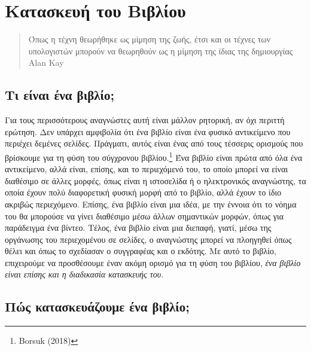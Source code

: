 \documentclass[
]{article}
\author{}
\date{}
\begin{document}
\hypertarget{ux3baux3b1ux3c4ux3b1ux3c3ux3baux3b5ux3c5ux3ae-ux3c4ux3bfux3c5-ux3b2ux3b9ux3b2ux3bbux3afux3bfux3c5}{%
\section{Κατασκευή του
Βιβλίου}\label{ux3baux3b1ux3c4ux3b1ux3c3ux3baux3b5ux3c5ux3ae-ux3c4ux3bfux3c5-ux3b2ux3b9ux3b2ux3bbux3afux3bfux3c5}}

\begin{quote}
Όπως η τέχνη θεωρήθηκε ως μίμηση της ζωής, έτσι και οι τέχνες των
υπολογιστών μπορούν να θεωρηθούν ως η μίμηση της ίδιας της δημιουργίας
Alan Kay
\end{quote}

\hypertarget{ux3c4ux3b9-ux3b5ux3afux3bdux3b1ux3b9-ux3adux3bdux3b1-ux3b2ux3b9ux3b2ux3bbux3afux3bf}{%
\subsection{Τι είναι ένα
βιβλίο;}\label{ux3c4ux3b9-ux3b5ux3afux3bdux3b1ux3b9-ux3adux3bdux3b1-ux3b2ux3b9ux3b2ux3bbux3afux3bf}}

Για τους περισσότερους αναγνώστες αυτή είναι μάλλον ρητορική, αν όχι
περιττή ερώτηση. Δεν υπάρχει αμφιβολία ότι ένα βιβλίο είναι ένα φυσικό
αντικείμενο που περιέχει δεμένες σελίδες. Πράγματι, αυτός είναι ένας από
τους τέσσερις ορισμούς που βρίσκουμε για τη φύση του σύγχρονου
βιβλίου.\footnote{Borsuk (2018)} Ένα βιβλίο είναι πρώτα από όλα ένα
αντικείμενο, αλλά είναι, επίσης, και το περιεχόμενό του, το οποίο μπορεί
να είναι διαθέσιμο σε άλλες μορφές, όπως είναι η ιστοσελίδα ή ο
ηλεκτρονικός αναγνώστης, τα οποία έχουν πολύ διαφορετική φυσική μορφή
από το βιβλίο, αλλά έχουν το ίδιο ακριβώς περιεχόμενο. Επίσης, ένα
βιβλίο είναι μια ιδέα, με την έννοια ότι το νόημα του θα μπορούσε να
γίνει διαθέσιμο μέσω άλλων σημαντικών μορφών, όπως για παράδειγμα ένα
βίντεο. Τέλος, ένα βιβλίο είναι μια διεπαφή, γιατί, μέσω της οργάνωσης
του περιεχομένου σε σελίδες, ο αναγνώστης μπορεί να πλοηγηθεί όπως θέλει
και όπως το σχεδίασαν ο συγγραφέας και ο εκδότης. Με αυτό το βιβλίο,
επιχειρούμε να προσθέσουμε έναν ακόμη ορισμό για τη φύση του βιβλίου,
\emph{ένα βιβλίο είναι επίσης και η διαδικασία κατασκευής του.}

\hypertarget{ux3c0ux3ceux3c2-ux3baux3b1ux3c4ux3b1ux3c3ux3baux3b5ux3c5ux3acux3b6ux3bfux3c5ux3bcux3b5-ux3adux3bdux3b1-ux3b2ux3b9ux3b2ux3bbux3afux3bf}{%
\subsection{Πώς κατασκευάζουμε ένα
βιβλίο;}\label{ux3c0ux3ceux3c2-ux3baux3b1ux3c4ux3b1ux3c3ux3baux3b5ux3c5ux3acux3b6ux3bfux3c5ux3bcux3b5-ux3adux3bdux3b1-ux3b2ux3b9ux3b2ux3bbux3afux3bf}}
\end{document}
